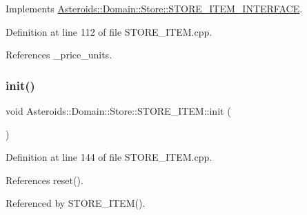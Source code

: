 Implements \hyperlink{classAsteroids_1_1Domain_1_1Store_1_1STORE__ITEM__INTERFACE_ae9fbf8488c53bbf068980d97866ec269}{Asteroids\+::\+Domain\+::\+Store\+::\+S\+T\+O\+R\+E\+\_\+\+I\+T\+E\+M\+\_\+\+I\+N\+T\+E\+R\+F\+A\+CE}.



Definition at line 112 of file S\+T\+O\+R\+E\+\_\+\+I\+T\+E\+M.\+cpp.



References \+\_\+price\+\_\+units.

\mbox{\label{classAsteroids_1_1Domain_1_1Store_1_1STORE__ITEM_a9357d523cd548598d07e9fb36fde6b90}} 
\subsubsection{\texorpdfstring{init()}{init()}}
{\footnotesize\ttfamily void Asteroids\+::\+Domain\+::\+Store\+::\+S\+T\+O\+R\+E\+\_\+\+I\+T\+E\+M\+::init (\begin{DoxyParamCaption}{ }\end{DoxyParamCaption})\hspace{0.3cm}{\ttfamily [private]}}



Definition at line 144 of file S\+T\+O\+R\+E\+\_\+\+I\+T\+E\+M.\+cpp.



References reset().



Referenced by S\+T\+O\+R\+E\+\_\+\+I\+T\+E\+M().

